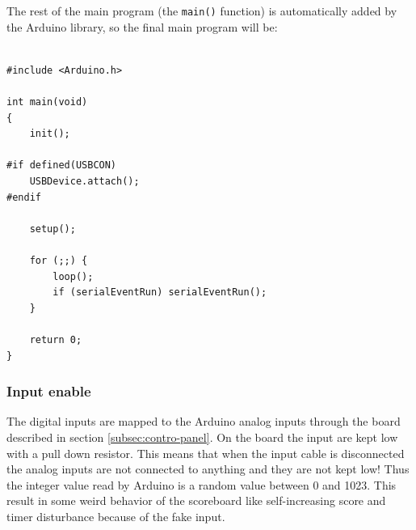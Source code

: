 \documentclass[11pt,english]{article}
\newcommand{\code}[1]{\texttt{#1}}
\begin{document}
The rest of the main program (the \code{main()} function) is automatically added by the Arduino library, 
so the final main program will be:

%
\begin{lstlisting}[label=lis:main-loop,caption=Main program from Arduino library]

#include <Arduino.h>

int main(void)
{
    init();

#if defined(USBCON)
    USBDevice.attach();
#endif
    
    setup();
    
    for (;;) {
        loop();
        if (serialEventRun) serialEventRun();
    }
        
    return 0;
}
\end{lstlisting}


\subsubsection{Input enable} \label{subsubsec:input-enable}

The digital inputs are mapped to the Arduino analog inputs through the board described in section 
\ref{subsec:contro-panel}. On the board the input are kept low with a pull down resistor. This means 
that when the input cable is disconnected the analog inputs are not connected to anything and they 
are not kept low! Thus the integer value read by Arduino is a random value between 0 and 1023.
This result in some weird behavior of the scoreboard like self-increasing score and timer disturbance 
because of the fake input. 
\end{document}

